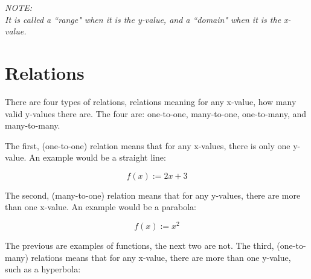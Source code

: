 \documentclass{book}
\newenvironment{note}{\begin{center}\em NOTE:\\}{\end{center}}
\begin{document}
\begin{note}
	It is called a ``range" when it is the y-value, and a ``domain" when it is the x-value.
\end{note}



\section{Relations}
There are four types of relations, relations meaning for any x-value, how many valid y-values there are.  The four are: one-to-one, many-to-one, one-to-many, and many-to-many.

The first, (one-to-one) relation means that for any x-values, there is only one y-value.  An example would be a straight line:
\begin{center}
	\[f(x) := 2x + 3\]
	\begin{center}
	\end{center}
\end{center}

The second, (many-to-one) relation means that for any y-values, there are more than one x-value.  An example would be a parabola:

\begin{center}
	\[f(x) := x^2\]
	\begin{center}
	\end{center}
\end{center}

The previous are examples of functions, the next two are not.  The third, (one-to-many) relations means that for any x-value, there are more than one y-value, such as a hyperbola:

\begin{center}
\end{center}
\end{document}
